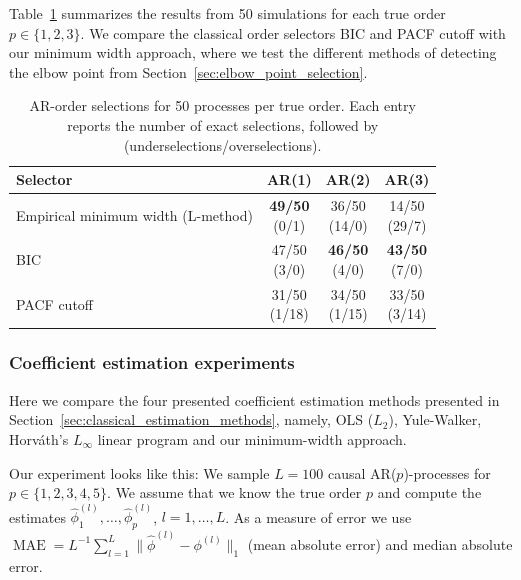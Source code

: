 Table~\ref{tab:geometric-bic-pacf-comparison} summarizes the results from 50 simulations for each true order $p\in\{1,2,3\}$. We compare the classical order selectors BIC and PACF cutoff with our minimum width approach, where we test the different methods of detecting the elbow point from Section~\ref{sec:elbow_point_selection}.

\begin{table}[htbp]
\centering
\caption{AR-order selections for 50 processes per true order.
Each entry reports the number of exact selections, followed by
(underselections/overselections).}
\label{tab:geometric-bic-pacf-comparison}
\begin{tabular}{lccc}
\toprule
Selector & AR(1) & AR(2) & AR(3) \\
\midrule
Empirical minimum width (L-method)
& \shortstack{\textbf{49/50} \\ (0/1)}
& \shortstack{36/50 \\ (14/0)}
& \shortstack{14/50 \\ (29/7)} \\
BIC
& \shortstack{47/50 \\ (3/0)}
& \shortstack{\textbf{46/50} \\ (4/0)}
& \shortstack{\textbf{43/50} \\ (7/0)} \\
PACF cutoff
& \shortstack{31/50 \\ (1/18)}
& \shortstack{34/50 \\ (1/15)}
& \shortstack{33/50 \\ (3/14)} \\
\bottomrule
\end{tabular}
\end{table}

\subsubsection{Coefficient estimation experiments}

Here we compare the four presented coefficient estimation methods presented in Section~\ref{sec:classical_estimation_methods}, namely, OLS ($L_2$), Yule-Walker, Horváth's $L_{\infty}$ linear program and our minimum-width approach.

Our experiment looks like this: We sample $L=100$ causal AR($p$)-processes for $p\in\{1,2,3,4,5\}$. We assume that we know the true order $p$ and compute the estimates $\hat{\phi}_1^{(l)},\dots,\hat{\phi}_p^{(l)}$, $l=1,\dots,L$. As a measure of error we use $\operatorname{MAE}=L^{-1}\sum_{l=1}^{L}\|\hat{\phi}^{(l)}-\phi^{(l)}\|_1$ (mean absolute error) and median absolute error.

